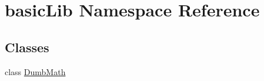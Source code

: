 \hypertarget{namespacebasicLib}{}\section{basic\+Lib Namespace Reference}
\label{namespacebasicLib}
\subsection*{Classes}
\begin{DoxyCompactItemize}
\item 
class \hyperlink{classbasicLib_1_1DumbMath}{Dumb\+Math}
\end{DoxyCompactItemize}
